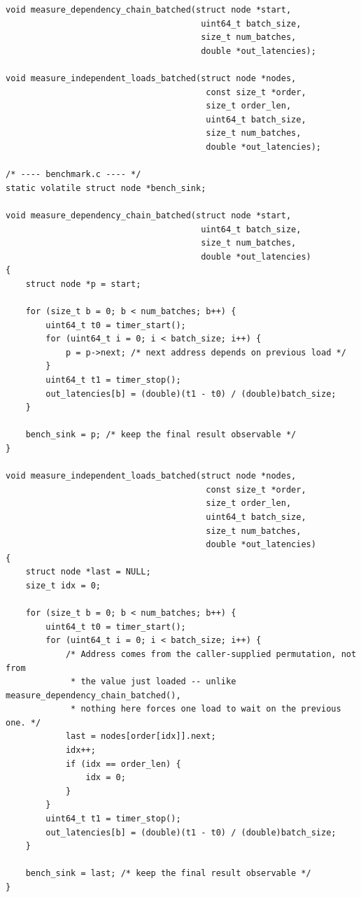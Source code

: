 \documentclass{article}
\begin{document}
\begin{lstlisting}[caption={Batched dependent and independent load timers (portable). File: \texttt{main\_code/common/benchmark.h} / \texttt{benchmark.c}, commit \texttt{e343732}.},label={lst:benchmark}]
void measure_dependency_chain_batched(struct node *start,
                                       uint64_t batch_size,
                                       size_t num_batches,
                                       double *out_latencies);

void measure_independent_loads_batched(struct node *nodes,
                                        const size_t *order,
                                        size_t order_len,
                                        uint64_t batch_size,
                                        size_t num_batches,
                                        double *out_latencies);

/* ---- benchmark.c ---- */
static volatile struct node *bench_sink;

void measure_dependency_chain_batched(struct node *start,
                                       uint64_t batch_size,
                                       size_t num_batches,
                                       double *out_latencies)
{
    struct node *p = start;

    for (size_t b = 0; b < num_batches; b++) {
        uint64_t t0 = timer_start();
        for (uint64_t i = 0; i < batch_size; i++) {
            p = p->next; /* next address depends on previous load */
        }
        uint64_t t1 = timer_stop();
        out_latencies[b] = (double)(t1 - t0) / (double)batch_size;
    }

    bench_sink = p; /* keep the final result observable */
}

void measure_independent_loads_batched(struct node *nodes,
                                        const size_t *order,
                                        size_t order_len,
                                        uint64_t batch_size,
                                        size_t num_batches,
                                        double *out_latencies)
{
    struct node *last = NULL;
    size_t idx = 0;

    for (size_t b = 0; b < num_batches; b++) {
        uint64_t t0 = timer_start();
        for (uint64_t i = 0; i < batch_size; i++) {
            /* Address comes from the caller-supplied permutation, not from
             * the value just loaded -- unlike measure_dependency_chain_batched(),
             * nothing here forces one load to wait on the previous one. */
            last = nodes[order[idx]].next;
            idx++;
            if (idx == order_len) {
                idx = 0;
            }
        }
        uint64_t t1 = timer_stop();
        out_latencies[b] = (double)(t1 - t0) / (double)batch_size;
    }

    bench_sink = last; /* keep the final result observable */
}
\end{lstlisting}
\end{document}
